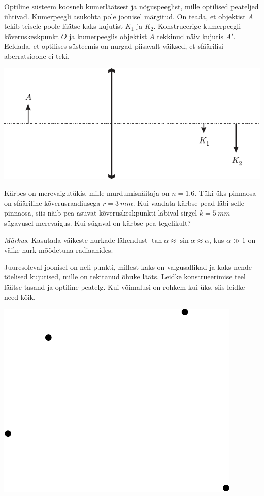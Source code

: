 \documentclass[10pt, twoside]{article}
\begin{document}
{
Optiline süsteem koosneb kumerläätsest ja nõguspeeglist, mille optilised peateljed ühtivad. Kumerpeegli asukohta pole joonisel märgitud. On teada, et objektist $A$ tekib teisele poole läätse kaks kujutist $K_1$ ja $K_2$. Konstrueerige kumerpeegli kõveruskeskpunkt $O$ ja kumerpeeglis objektist $A$ tekkinud näiv kujutis $A'$. Eeldada, et optilises süsteemis on nurgad piisavalt väiksed, et sfäärilisi aberratsioone ei teki.

\begin{center}
	\includegraphics[width=\linewidth]{2007-v3g-09-yl}
\end{center}
\probend
\bigskip


Kärbes on merevaigutükis, mille murdumisnäitaja on $n=\num{1,6}$. Tüki üks pinnaosa on sfääriline kõverusraadiusega $r = \SI{3}{mm}$. Kui vaadata kärbse pead läbi selle pinnaosa, siis näib pea asuvat kõveruskeskpunkti läbival sirgel $k = \SI{5}{mm}$ sügavusel merevaigus. Kui sügaval on kärbse pea tegelikult? 

\emph{Märkus}. Kasutada väikeste nurkade lähendust $\tan \alpha \approx \sin \alpha \approx \alpha$, kus $\alpha \gg 1$ on väike nurk mõõdetuna radiaanides.
\probend
\bigskip


Juuresoleval joonisel on neli punkti, millest kaks on valgusallikad ja kaks nende tõelised kujutised, mille on tekitanud õhuke lääts. Leidke konstrueerimise teel läätse tasand ja optiline peatelg. Kui võimalusi on rohkem kui üks, siis leidke need kõik.

\begin{center}
	\includegraphics[width=0.3\linewidth]{2010-v3g-09-punktid}
\end{center}
\probend
\bigskip

}
\end{document}
